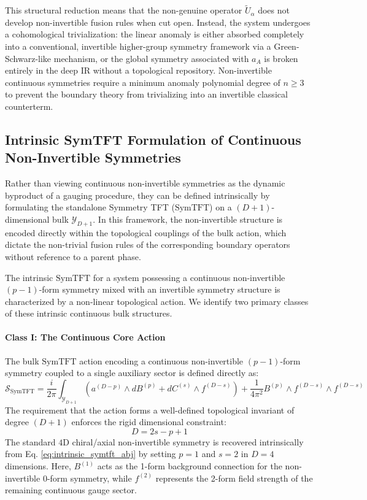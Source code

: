 \documentclass[aps,preprint,nofootinbib,preprintnumbers,eqsecnum,superscriptaddress]{revtex4}
\numberwithin{equation}{section}
\begin{document}
This structural reduction means that the non-genuine operator $\tilde{U}_\alpha$ does not develop non-invertible fusion rules when cut open. Instead, the system undergoes a cohomological trivialization: the linear anomaly is either absorbed completely into a conventional, invertible higher-group symmetry framework via a Green-Schwarz-like mechanism, or the global symmetry associated with $a_A$ is broken entirely in the deep IR without a topological repository. Non-invertible continuous symmetries require a minimum anomaly polynomial degree of $n \geq 3$ to prevent the boundary theory from trivializing into an invertible classical counterterm.

\subsection{Intrinsic SymTFT Formulation of Continuous Non-Invertible Symmetries}
\label{sec:intrinsic_symtft}

Rather than viewing continuous non-invertible symmetries as the dynamic byproduct of a gauging procedure, they can be defined intrinsically by formulating the standalone Symmetry TFT ($\text{SymTFT}$) on a $(D+1)$-dimensional bulk $\mathcal{Y}_{D+1}$. In this framework, the non-invertible structure is encoded directly within the topological couplings of the bulk action, which dictate the non-trivial fusion rules of the corresponding boundary operators without reference to a parent phase.

The intrinsic $\text{SymTFT}$ for a system possessing a continuous non-invertible $(p-1)$-form symmetry mixed with an invertible symmetry structure is characterized by a non-linear topological action. We identify two primary classes of these intrinsic continuous bulk structures.

\paragraph{Class I: The Continuous Core Action}
The bulk $\text{SymTFT}$ action encoding a continuous non-invertible $(p-1)$-form symmetry coupled to a single auxiliary sector is defined directly as:
\begin{equation}\label{eq:intrinsic_symtft_abj}
    \mathcal{S}_\text{SymTFT} = \frac{i}{2\pi} \int_{\mathcal{Y}_{D+1}} \left( a^{(D-p)} \wedge dB^{(p)} + dC^{(s)} \wedge f^{(D-s)} \right) + \frac{1}{4\pi^2} B^{(p)} \wedge f^{(D-s)} \wedge f^{(D-s)}
\end{equation}
The requirement that the action forms a well-defined topological invariant of degree $(D+1)$ enforces the rigid dimensional constraint:
\begin{equation}
    D = 2s - p + 1
\end{equation}
The standard $4\text{D}$ chiral/axial non-invertible symmetry \cite{cordova2022noninvertiblechiralsymmetryexponential, choi2022noninvertibleglobalsymmetriesstandard} is recovered intrinsically from Eq. \eqref{eq:intrinsic_symtft_abj} by setting $p=1$ and $s=2$ in $D=4$ dimensions. Here, $B^{(1)}$ acts as the 1-form background connection for the non-invertible $0$-form symmetry, while $f^{(2)}$ represents the 2-form field strength of the remaining continuous gauge sector.
\end{document}
